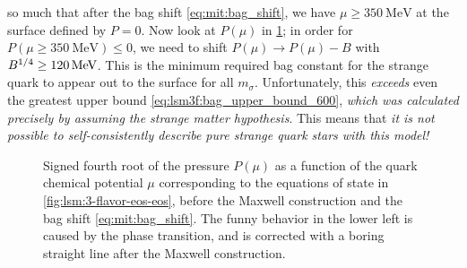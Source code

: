 so much that after the bag shift \eqref{eq:mit:bag_shift},
we have $\mu \geq \SI{350}{\mega\electronvolt}$ at the surface defined by $P=0$.
Now look at $P(\mu)$ in \cref{fig:lsm:3-flavor-pressure};
in order for $P(\mu \geq \SI{350}{\mega\electronvolt}) \leq 0$, we need to shift $P(\mu) \rightarrow P(\mu) - B$
with $\smash{B^{1/4}} \geq \SI{120}{\mega\electronvolt}$.
This is the minimum required bag constant for the strange quark to appear out to the surface for all $m_\sigma$.
Unfortunately, this \emph{exceeds} even the greatest upper bound \eqref{eq:lsm3f:bag_upper_bound_600},
\emph{which was calculated precisely by assuming the strange matter hypothesis}.
This means that \emph{it is not possible to self-consistently describe pure strange quark stars with this model!}

\begin{figure}[b!]
\centering
{}
\caption{\label{fig:lsm:3-flavor-pressure}%
	Signed fourth root of the pressure $P(\mu)$ as a function of the quark chemical potential $\mu$
	corresponding to the equations of state in \cref{fig:lsm:3-flavor-eos-eos},
	before the Maxwell construction and the bag shift \eqref{eq:mit:bag_shift}.
	The funny behavior in the lower left is caused by the phase transition,
	and is corrected with a boring straight line after the Maxwell construction.
}
\end{figure}

